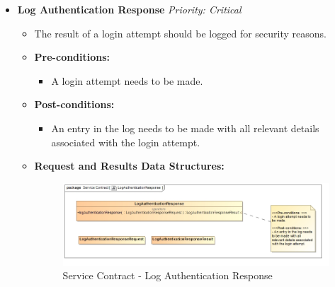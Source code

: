 \documentclass{article}
\begin{document}
\begin{itemize}
					\cleardoublepage
					\item \textbf{Log Authentication Response} \hfill \textit{Priority: Critical}
					\begin{itemize}
						\item The result of a login attempt should be logged for security reasons.
						\item \textbf{Pre-conditions:}
						\begin{itemize}
							\item A login attempt needs to be made.
						\end{itemize}
						\item \textbf{Post-conditions:}
						\begin{itemize}
							\item An entry in the log needs to be made with all relevant details associated with the login attempt.
						\end{itemize}
						\item \textbf{Request and Results Data Structures:}
						\begin{figure}[H]
							\includegraphics[width=\linewidth]{../Diagrams/ServiceContracts/LogAuthenticationResponse.jpg}
							\caption{Service Contract - Log Authentication Response}
						\end{figure}
					\end{itemize}
					

\end{itemize}
\end{document}

